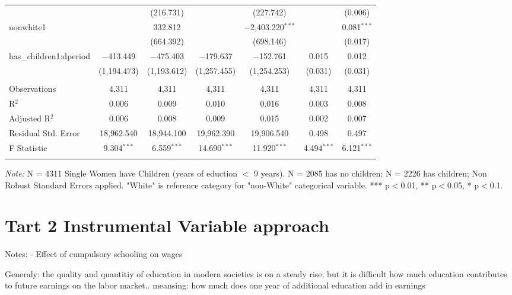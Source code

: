 \documentclass[a4paper]{article}
\begin{document}
\begin{table}[!htbp]
\begin{adjustwidth}{0.cm}{-0cm}
\begin{threeparttable}
\begin{tabular}{@{\extracolsep{-2pt}}lcccccc}
  &  & (216.731) &  & (227.742) &  & (0.006) \\ 
  nonwhite1 &  & 332.812 &  & $-$2,403.220$^{***}$ &  & 0.081$^{***}$ \\ 
  &  & (664.392) &  & (698.146) &  & (0.017) \\ 
  has\_children1:dperiod & $-$413.449 & $-$475.403 & $-$179.637 & $-$152.761 & 0.015 & 0.012 \\ 
  & (1,194.473) & (1,193.612) & (1,257.455) & (1,254.253) & (0.031) & (0.031) \\ 
 \hline \\[-1.8ex] 
Observations & 4,311 & 4,311 & 4,311 & 4,311 & 4,311 & 4,311 \\ 
R$^{2}$ & 0.006 & 0.009 & 0.010 & 0.016 & 0.003 & 0.008 \\ 
Adjusted R$^{2}$ & 0.006 & 0.008 & 0.009 & 0.015 & 0.002 & 0.007 \\ 
Residual Std. Error & 18,962.540 & 18,944.100 & 19,962.390  & 19,906.540  & 0.498  & 0.497 \\ 
F Statistic & 9.304$^{***}$ & 6.559$^{***}$  & 14.690$^{***}$ & 11.920$^{***}$ & 4.494$^{***}$ & 6.121$^{***}$  \\ 
\hline 
\hline \\[-3.5ex] 
\end{tabular} 
\begin{tablenotes}
      \small
      \item\textit{Note:} N = 4311 Single Women have Children (years of eduction $<$ 9 years). N = 2085 has no children; N = 2226 has children; Non Robust Standard Errors applied. "White" is reference category for "non-White" categorical variable. *** p$<$0.01, ** p$<$0.05, * p$<$0.1.
    \end{tablenotes}
\end{threeparttable}
\end{adjustwidth}
%
\end{table}




\pagebreak

\section{Tart 2 Instrumental Variable approach}


Notes:
- Effect of cumpulsory schooling on wages

Generaly: the quality and quantitiy of education in modern societies is on a steady rise; but it is difficult how much education contributes to future earnings on the labor market.. meansing: how much does one year of additional education add in earnings
\end{document}

